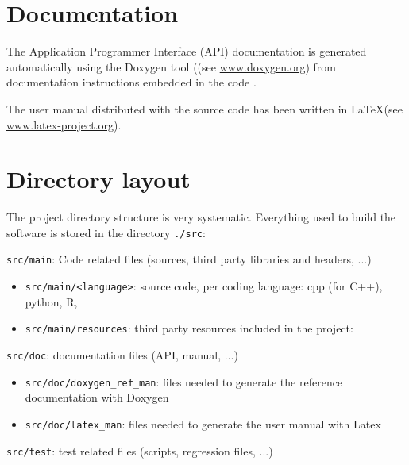 %
\section{Documentation}
\label{section:documentation}

The Application Programmer Interface (API) documentation is generated automatically 
using the Doxygen tool ((see \url{www.doxygen.org}) from documentation instructions 
embedded in the code . 

The user manual distributed with the source code has been written in \LaTeX (see \url{www.latex-project.org}).



%
\section{Directory layout}

The project directory structure is very systematic.
Everything used to build the software is stored in the directory \texttt{./src}:
\begin{compactitem}
    \item \texttt{src/main}: Code related files (sources, third party libraries and headers, ...)
      	\begin{itemize}
        		\item \texttt{src/main/<language>}: source code, per coding language: cpp (for C++), python, R,   
        		\item \texttt{src/main/resources}: third party resources included in the project: 
        \end{itemize}
    \item \texttt{src/doc}: documentation files (API, manual, ...)
      	\begin{itemize}
        		\item \texttt{src/doc/doxygen\_ref\_man}: files needed to generate the reference documentation with Doxygen
        		\item \texttt{src/doc/latex\_man}: files needed to generate the user manual with Latex
        \end{itemize}
    \item \texttt{src/test}: test related files (scripts, regression files, ...)
\end{compactitem}

